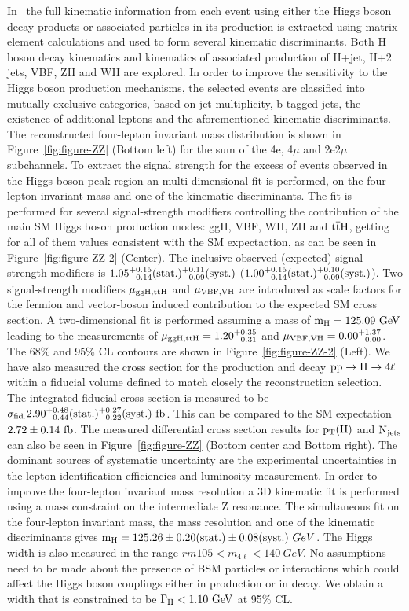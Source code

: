 \documentclass[10pt]{article}
\begin{document}
In~\cite{CMS:2017jkd} the full kinematic information from each event using either
the Higgs boson decay products or associated particles in its production is
extracted using matrix element calculations and used to form several kinematic
discriminants. Both H boson decay kinematics and kinematics of associated
production of H+jet, H+2 jets, VBF, ZH and WH are explored. In order to improve
the sensitivity to the Higgs boson production mechanisms, the selected events
are classified into mutually exclusive categories, based on jet multiplicity,
b-tagged jets, the existence of additional leptons and the aforementioned
kinematic discriminants. The reconstructed four-lepton invariant mass distribution
is shown in Figure~\ref{fig:figure-ZZ} (Bottom left) for the sum of the 4e,
4$\mu$ and 2e2$\mu$ subchannels. To extract the signal strength for the excess
of events observed in the Higgs boson peak region an multi-dimensional fit
is performed, on the four-lepton invariant mass and one of the kinematic
discriminants. The fit is performed for several signal-strength modifiers
controlling the contribution of the main SM Higgs boson production modes: ggH,
VBF, WH, ZH and ${\rm t{\bar t}H}$, getting for all of them values consistent
with the SM expectaction, as can be seen in Figure~\ref{fig:figure-ZZ-2} (Center).
The inclusive observed (expected) signal-strength
modifiers is ${\rm 1.05_{-0.14}^{+0.15}(stat.)_{-0.09}^{+0.11}(syst.)}$
(${\rm 1.00_{-0.14}^{+0.15}(stat.)_{-0.09}^{+0.10}(syst.)}$).
Two signal-strength modifiers ${\rm \mu_{ggH,ttH}}$ and ${\rm \mu_{VBF,VH}}$ are
introduced as scale factors for the fermion and vector-boson induced contribution
to the expected SM cross section. A two-dimensional fit is performed assuming a
mass of ${\rm m_H = 125.09~GeV}$ leading to the measurements of
${\rm \mu_{ggH,ttH} = 1.20_{-0.31}^{+0.35}}$ and
${\rm \mu_{VBF,VH} = 0.00_{-0.00}^{+1.37}}$. The 68\% and 95\% CL contours are
shown in Figure~\ref{fig:figure-ZZ-2} (Left). We have also
measured the cross section for the production and decay ${\rm pp \to H \to 4\ell}$
within a fiducial volume defined to match closely the reconstruction selection.
The integrated fiducial cross section is measured to be
${\rm \sigma_{fid.} 2.90_{-0.44}^{+0.48}(stat.)_{-0.22}^{+0.27}(syst.)~fb}$.
This can be compared to the SM expectation
${\rm 2.72 \pm 0.14~fb}$. The measured differential cross section results for
${\rm p_{T}(H)}$ and ${\rm N_{jets}}$ can also be seen in Figure~\ref{fig:figure-ZZ}
(Bottom center and Bottom right). The dominant sources of systematic uncertainty are
the experimental uncertainties in the lepton identification efficiencies and
luminosity measurement. In order to improve the four-lepton invariant mass
resolution a 3D kinematic fit is performed using a mass constraint on the
intermediate Z resonance. The simultaneous fit on the four-lepton
invariant mass, the mass resolution and one of the kinematic discriminants
gives ${\rm m_{H} = 125.26 \pm 0.20(stat.) \pm 0.08(syst.)}~GeV$. The Higgs
width is also measured in the range ${rm 105 < m_{4\ell} < 140~GeV}$. No
assumptions need to be made about the presence of BSM particles or interactions
which could affect the Higgs boson couplings either in production or in decay.
We obtain a width that is constrained to be ${\rm \Gamma_{H} < 1.10~GeV}$ at
95\% CL.
\end{document}
